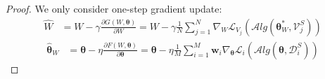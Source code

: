 \begin{proof}
We only consider one-step gradient update:
\begin{equation}
    \begin{aligned}
    \widehat{W} &= W - \gamma \frac{\partial G(W, \boldsymbol{\theta})}{\partial W} = W - \gamma \frac{1}{N} \sum_{j=1}^{N} \nabla_{W} \mathcal{L}_{V_j}(\mathcal{A}lg(\boldsymbol{\theta}^{*}_{W}, \mathcal{V}_{j}^{S}))
    \end{aligned}
\end{equation}
\begin{equation}
\label{theta-der}
\begin{aligned}
    \widehat{\boldsymbol{\theta}}_W &= \boldsymbol{\theta} - \eta \frac{\partial F(W, \boldsymbol{\theta})}{\partial \boldsymbol{\theta}} = \boldsymbol{\theta} - \eta \frac{1}{M}\sum_{i=1}^{M}\mathbf{w}_i \nabla_{\boldsymbol{\theta}} \mathcal{L}_{i}(\mathcal{A}lg(\boldsymbol{\theta}, \mathcal{D}_i^{S}))
    \end{aligned}
\end{equation}


\end{proof}
